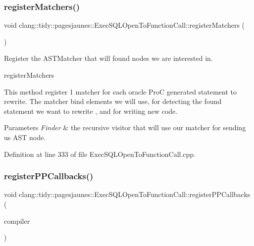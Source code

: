 \subsubsection{\texorpdfstring{register\+Matchers()}{registerMatchers()}}
{\footnotesize\ttfamily void clang\+::tidy\+::pagesjaunes\+::\+Exec\+S\+Q\+L\+Open\+To\+Function\+Call\+::register\+Matchers (\begin{DoxyParamCaption}\item[{ast\+\_\+matchers\+::\+Match\+Finder $\ast$}]{ }\end{DoxyParamCaption})\hspace{0.3cm}{\ttfamily [override]}}



Register the A\+S\+T\+Matcher that will found nodes we are interested in. 

register\+Matchers

This method register 1 matcher for each oracle ProC generated statement to rewrite. The matcher bind elements we will use, for detecting the found statement we want to rewrite , and for writing new code.


\begin{DoxyParams}{Parameters}
{\em Finder} & the recursive visitor that will use our matcher for sending us A\+ST node. \\
\hline
\end{DoxyParams}


Definition at line 333 of file Exec\+S\+Q\+L\+Open\+To\+Function\+Call.\+cpp.

\mbox{\label{classclang_1_1tidy_1_1pagesjaunes_1_1_exec_s_q_l_open_to_function_call_a85a5f5ed46dfa97a2cf12e5af10c1591}} 
\subsubsection{\texorpdfstring{register\+P\+P\+Callbacks()}{registerPPCallbacks()}}
{\footnotesize\ttfamily void clang\+::tidy\+::pagesjaunes\+::\+Exec\+S\+Q\+L\+Open\+To\+Function\+Call\+::register\+P\+P\+Callbacks (\begin{DoxyParamCaption}\item[{Compiler\+Instance \&}]{compiler }\end{DoxyParamCaption})\hspace{0.3cm}{\ttfamily [override]}}



